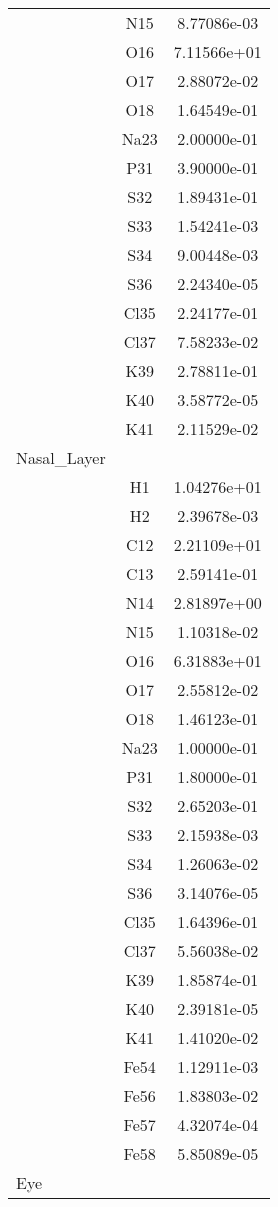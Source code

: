 \begin{centering}
\begin{longtable}{l c c}
& N15 & 8.77086e-03 \\ 
& O16 & 7.11566e+01 \\ 
& O17 & 2.88072e-02 \\ 
& O18 & 1.64549e-01 \\ 
& Na23 & 2.00000e-01 \\ 
& P31 & 3.90000e-01 \\ 
& S32 & 1.89431e-01 \\ 
& S33 & 1.54241e-03 \\ 
& S34 & 9.00448e-03 \\ 
& S36 & 2.24340e-05 \\ 
& Cl35 & 2.24177e-01 \\ 
& Cl37 & 7.58233e-02 \\ 
& K39 & 2.78811e-01 \\ 
& K40 & 3.58772e-05 \\ 
& K41 & 2.11529e-02 \\ 
\hline
Nasal\_Layer & & \\
\hline
& H1 & 1.04276e+01 \\ 
& H2 & 2.39678e-03 \\ 
& C12 & 2.21109e+01 \\ 
& C13 & 2.59141e-01 \\ 
& N14 & 2.81897e+00 \\ 
& N15 & 1.10318e-02 \\ 
& O16 & 6.31883e+01 \\ 
& O17 & 2.55812e-02 \\ 
& O18 & 1.46123e-01 \\ 
& Na23 & 1.00000e-01 \\ 
& P31 & 1.80000e-01 \\ 
& S32 & 2.65203e-01 \\ 
& S33 & 2.15938e-03 \\ 
& S34 & 1.26063e-02 \\ 
& S36 & 3.14076e-05 \\ 
& Cl35 & 1.64396e-01 \\ 
& Cl37 & 5.56038e-02 \\ 
& K39 & 1.85874e-01 \\ 
& K40 & 2.39181e-05 \\ 
& K41 & 1.41020e-02 \\ 
& Fe54 & 1.12911e-03 \\ 
& Fe56 & 1.83803e-02 \\ 
& Fe57 & 4.32074e-04 \\ 
& Fe58 & 5.85089e-05 \\ 
\hline
Eye & & \\

\end{longtable}
\end{centering}
